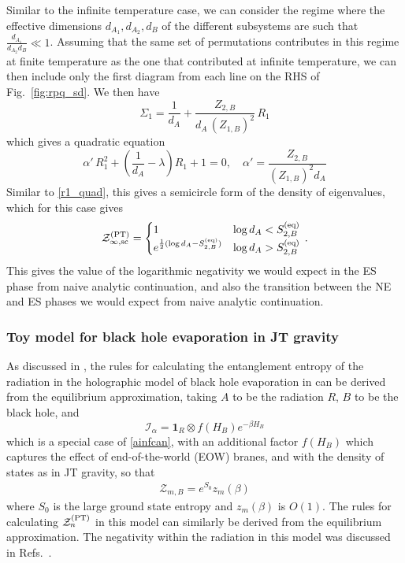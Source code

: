 \documentclass[a4paper,11pt]{article}
\newcommand{\be}{\begin{equation}}
\newcommand{\ee}{\end{equation}}
\newcommand\al{{\alpha}}
\newcommand\sI{{\ensuremath{{\mathcal I}}}}
\newcommand\sZ{{\mathcal Z}}
\begin{document}
\begin{enumerate}
\begin{appendix}
Similar to the infinite temperature case, we can consider the regime where the effective dimensions $d_{A_1}, d_{A_2}, d_{B}$ of the different subsystems are such that $\frac{d_{A_1}}{d_{A_2} d_B}\ll 1$. Assuming that the same set of permutations contributes in this regime at finite temperature as the one that contributed at infinite temperature, we can then include only the first diagram from each line on the RHS of Fig.~\ref{fig:rpq_sd}. We then have
\be 
\Sigma_1 = \frac{1}{d_A} + \frac{Z_{2, B}}{d_A\, (Z_{1,B})^{2}}\, R_1
\ee 
which gives a quadratic equation 
\be 
 \alpha' \, R_1^2 + \left(\frac{1}{d_A}-\lambda\right) R_1+ 1= 0 , \quad \alpha' = \frac{Z_{2, B}}{(Z_{1, B})^2 d_A} \label{r1_quad_2}
\ee
Similar to \eqref{r1_quad}, this gives a semicircle form of the density of eigenvalues,
which for this case gives 
 \be 
 \sZ^{\rm (PT)}_{\infty, {\rm sc}} = \begin{cases} 
1 & \log d_A < S^{\rm (eq)}_{2,B} \\
e^{\frac{1}{2}(\log d_A - S^{\rm (eq)}_{2, B})}&\log d_A > S^{\rm (eq)}_{2,B}
\end{cases} \, . \label{zsc_inf}
 \ee
 This gives the value of the logarithmic negativity we would expect in the ES phase from naive analytic continuation, and also the transition between the NE and ES phases we would expect from naive analytic continuation. 


\subsubsection{Toy model for black hole evaporation in JT gravity}
\label{pssy}

As discussed in \cite{2020arXiv200801089L}, the rules for calculating the entanglement entropy of the radiation in the holographic model of black hole evaporation in \cite{2019arXiv191111977P} can be derived from the equilibrium approximation, taking $A$ to be the radiation $R$, $B$ to be the black hole, and 
\be 
\sI_{\al} = \mathbf{1}_R \otimes f(H_B) e^{-\beta H_B} \label{jt}
\ee
which is a special case of \eqref{ainfcan}, with an additional factor $f(H_B)$ which captures the effect of end-of-the-world (EOW) branes, and with the density of states as in JT gravity, so that 
\begin{align}
 \mathcal{Z}_{m,B} = e^{S_0} z_m(\beta) \label{zm_jt}
\end{align}
where $S_0$ is the large ground state entropy and $z_m(\beta)$ is $O(1)$. The rules for calculating $\sZ_n^{\rm (PT)}$ in this model can similarly be derived from the equilibrium approximation. The negativity within the radiation in this model was discussed in Refs.~\cite{2021arXiv210902649K, 2021arXiv211011947D}.


\end{appendix}
\end{enumerate}
\end{document}

